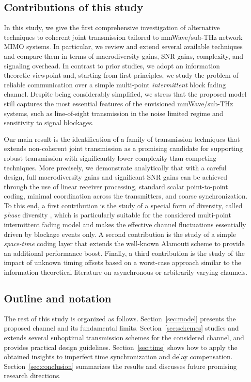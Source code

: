 \documentclass[10pt,journal,a4paper]{IEEEtran}
\begin{document}
\subsection{Contributions of this study}
In this study, we give the first comprehensive investigation of alternative techniques to coherent joint transmission tailored to mmWave/sub-THz network MIMO systems. In particular, we review and extend several available techniques and compare them in terms of macrodiversity gains, SNR gains, complexity, and signaling overhead. In contrast to prior studies, we adopt an information theoretic viewpoint and, starting from first principles, we study the problem of reliable communication over a simple multi-point \textit{intermittent} block fading channel. Despite being considerably simplified, we stress that the proposed model still captures the most essential features of the envisioned mmWave/sub-THz systems, such as line-of-sight transmission in the noise limited regime and sensitivity to signal blockages. %

Our main result is the identification of a family of transmission techniques that extends non-coherent joint transmission as a promising candidate for supporting robust transmission with significantly lower complexity than competing techniques. More precisely, we demonstrate analytically that with a careful design, full macrodiversity gains and significant SNR gains can be achieved through the use of linear receiver processing, standard scalar point-to-point coding, minimal coordination across the transmitters, and coarse synchronization. To this end, a first contribution is the study of a special form of diversity, called \textit{phase} diversity \cite{dammann2002low}, which is particularly suitable for the considered multi-point intermittent fading model and makes the effective channel fluctuations essentially driven by blockage events only. A second contribution is the study of a simple \textit{space-time} coding layer that extends the well-known Alamouti scheme \cite{alamouti1998} to provide an additional performance boost. Finally, a third contribution is the study of the impact of unknown timing offsets based on a worst-case approach similar to the information theoretical literature on asynchronous \cite{cover1982asynchronous} or arbitrarily varying \cite{blackwell1960capacities} channels.

\subsection{Outline and notation}
The rest of this study is organized as follows. Section~\ref{sec:model} presents the proposed channel and its fundamental limits. Section~\ref{sec:schemes} studies and extends several suboptimal transmission schemes for the considered channel, and provides practical design guidelines. Section~\ref{sec:time} shows how to apply the obtained insights to imperfect time synchronization and delay compensation. Section~\ref{sec:conclusion} summarizes the results and discusses future promising research directions.
\end{document}
